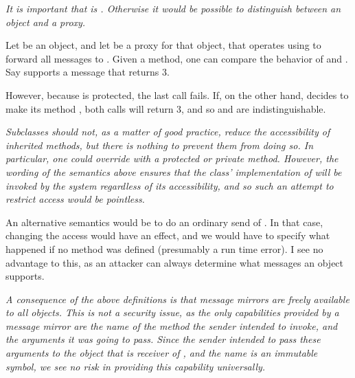 \documentclass{article}
\begin{document}
{\it
It is important that  is \PROTECTED{}. Otherwise it would be possible to distinguish between an object and a proxy. 

Let  be an object, and let  be a proxy for that object, that
operates using  to forward all messages to .
Given a \PUBLIC{}  method, one can compare the behavior
of  and . Say  supports a message  that returns 3.





However, because   is protected, the last call fails. If, on the other hand,    decides to make its    method \PUBLIC{}, both calls will return 3, and so  and  are indistinguishable.
}

{\it
Subclasses should not, as a matter of good practice, reduce the accessibility of inherited methods, but there is nothing to prevent them from doing so. In particular, one could override  with a protected or private method. However, the wording of the semantics above ensures that the class' implementation of    will be invoked by the system regardless of its accessibility, and so such an attempt to restrict access would be pointless.


An alternative semantics would be to do an ordinary send of  . In that case, changing the access would have an effect, and we would have to specify what happened if no
  method was defined (presumably a run time error). I see no advantage to
 this, as an attacker can always determine what messages an object supports.
}

{\it
A consequence of the above definitions is that message mirrors are freely available to all objects. This is not a security issue, as the only capabilities provided by a message mirror are the name of the method the sender intended to invoke, and the arguments it was going to pass. Since the sender intended to pass these arguments to the object that is receiver of , and the name is an immutable symbol, we see no risk in providing this capability universally.
}
\end{document}
